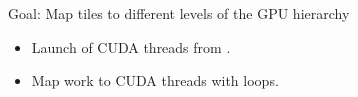 {\LARGE

Goal: Map tiles to different levels of the GPU hierarchy

\begin{itemize}
\item Launch  of CUDA threads from .
\item Map work to CUDA threads with  loops.
\end{itemize}

}
